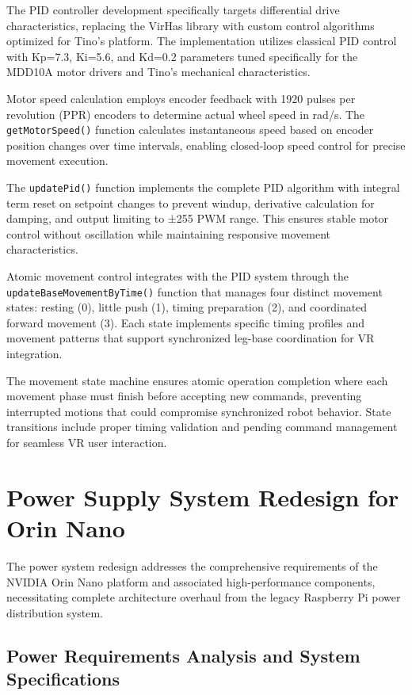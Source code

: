 The PID controller development specifically targets differential drive characteristics, replacing the VirHas library with custom control algorithms optimized for Tino's platform. The implementation utilizes classical PID control with Kp=7.3, Ki=5.6, and Kd=0.2 parameters tuned specifically for the MDD10A motor drivers and Tino's mechanical characteristics.

Motor speed calculation employs encoder feedback with 1920 pulses per revolution (PPR) encoders to determine actual wheel speed  in rad/s. The \texttt{getMotorSpeed()} function calculates instantaneous speed based on encoder position changes over time intervals, enabling closed-loop speed control for precise movement execution.

The \texttt{updatePid()} function implements the complete PID algorithm with integral term reset on setpoint changes to prevent windup, derivative calculation for damping, and output limiting to ±255 PWM range. This ensures stable motor control without oscillation while maintaining responsive movement characteristics.

Atomic movement control integrates with the PID system through the \texttt{updateBaseMovementByTime()} function that manages four distinct movement states: resting (0), little push (1), timing preparation (2), and coordinated forward movement (3). Each state implements specific timing profiles and movement patterns that support synchronized leg-base coordination for VR integration.

The movement state machine ensures atomic operation completion where each movement phase must finish before accepting new commands, preventing interrupted motions that could compromise synchronized robot behavior. State transitions include proper timing validation and pending command management for seamless VR user interaction.

\section{Power Supply System Redesign for Orin Nano}

The power system redesign addresses the comprehensive requirements of the NVIDIA Orin Nano platform and associated high-performance components, necessitating complete architecture overhaul from the legacy Raspberry Pi power distribution system.

\subsection{Power Requirements Analysis and System Specifications}



